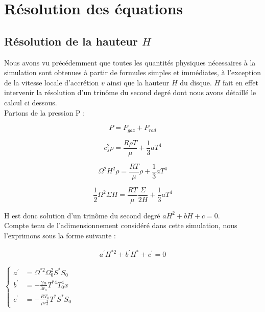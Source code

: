 \section{Résolution des équations}

\subsection{Résolution de la hauteur $H$ \label{sec::res_H}}
Nous avons vu précédemment que toutes les quantités physiques nécessaires à la simulation sont obtenues à partir de formules simples et immédiates, à l'exception de la vitesse locale d'accrétion $v$ ainsi que la hauteur $H$ du disque.  $H$ fait en effet intervenir la résolution d'un trinôme du second degré dont nous avons détaillé le calcul ci dessous. \\

Partons de la pression P : 

\begin{equation}
	P = P_{gaz} + P_{rad}
\end{equation}


\begin{equation}
	c_{s}^{2} \rho = \frac{R \rho T}{\mu} + \frac{1}{3} a T^{4}
\end{equation}


\begin{equation}
	\Omega^{2} H^{2} \rho = \frac{R T}{\mu} \rho + \frac{1}{3} a T^{4}
\end{equation}


\begin{equation}
	\frac{1}{2} \Omega^{2} \Sigma H = \frac{R T}{\mu} \frac{\Sigma}{2 H} + \frac{1}{3} a T^{4}
\end{equation}

H est donc solution d'un trinôme du second degré $ a H^{2} + b H + c = 0$. \\
Compte tenu de l'adimensionnement considéré dans cette simulation, nous l'exprimons sous la forme suivante :  

\begin{eqnarray}
  a^{\prime} H^{* 2}+b^{\prime}H^{*}+c^{\prime}=0
  \end{eqnarray}

$\begin{cases}  
      a^{\prime} &= \Omega^{*2} \Omega_{0}^{2} S^{*} S_{0}\\
      b^{\prime} &= - \frac{2 a}{3 r_{s}} T^{*4} T_{0}^{4} x \\
      c^{\prime}&=-\frac{RT_{0}}{\mu r_{s}^{2}} T^{*} S^{*} S_{0}
     \end{cases}$ \\


